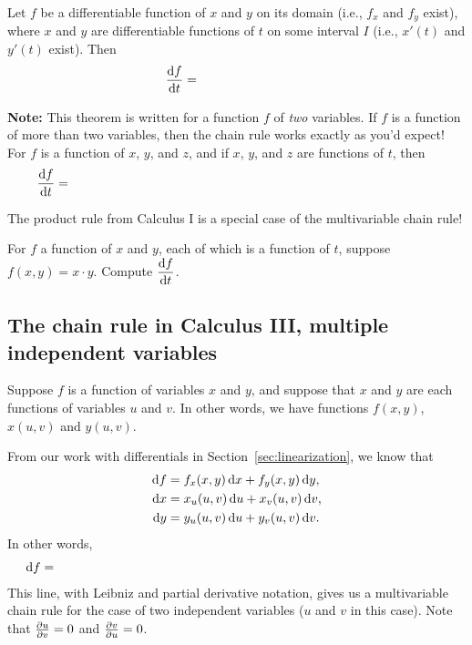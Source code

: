 \begin{thm}
    Let $f$ be a differentiable function of $x$ and $y$ on its domain (i.e., $f_x$ and $f_y$ exist), where $x$ and $y$ are differentiable functions of $t$ on some interval $I$ (i.e., $x'(t)$ and $y'(t)$ exist). Then 
    \[
        \dfd{f}{t}=\phantom{\pfp{f}{x}\cdot\dfd{x}{t}+\pfp{f}{y}\cdot\dfd{y}{t}.}
    \]
\end{thm}
\noindent \textbf{Note:} This theorem is written for a function $f$ of \emph{two} variables. If $f$ is a function of more than two variables, then the chain rule works exactly as you'd expect! For $f$ is a function of $x$, $y$, and $z$, and if $x$, $y$, and $z$ are functions of $t$, then 
\[
    \dfd{f}{t} = \hspace{4in}
\]

\pagebreak 

The product rule from Calculus I is a special case of the multivariable chain rule!
\begin{ex}
    For $f$ a function of $x$ and $y$, each of which is a function of $t$, suppose $f(x,y)=x\cdot y$. Compute $\displaystyle\frac{\mathop{}\!\mathrm{d} f}{\mathop{}\!\mathrm{d} t}$.
\end{ex}

\vspace{1.5in}

\subsection{The chain rule in Calculus III, multiple independent variables}
Suppose $f$ is a function of variables $x$ and $y$, and suppose that $x$ and $y$ are each functions of variables $u$ and $v$. In other words, we have functions $f(x,y)$, $x(u,v)$ and $y(u,v)$.

From our work with differentials in Section~\ref{sec:linearization}, we know that 
\begin{align*}
    \dif f &= f_x(x,y)\dx+f_y(x,y)\dy,\\
    \dif x &= x_u(u,v)\dif u+x_v(u,v)\dif v,\\
    \dif y &= y_u(u,v)\dif u+y_v(u,v)\dif v.
\end{align*}
In other words, 
\[
    \dif f = \phantom{f_x(x,y)\big[x_u(u,v)\dif u+x_v(u,v)\dif v\big]+f_y(x,y)\big[y_u(u,v)\dif u+y_v(u,v)\dif v\big].}
\]
This line, with Leibniz and partial derivative notation, gives us a multivariable chain rule for the case of two independent variables ($u$ and $v$ in this case). Note that $\frac{\partial u}{\partial v}=0$ and $\frac{\partial v}{\partial u}=0$.

